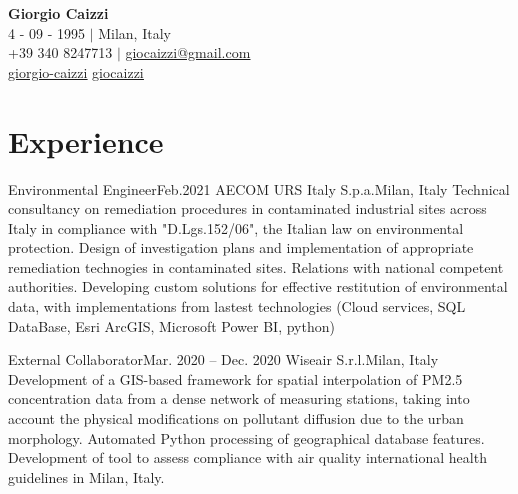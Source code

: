 




\begin{center}
  \textbf{\Huge \bfseries Giorgio Caizzi} \\
  \vspace{2pt} 4 - 09 - 1995 $|$ Milan, Italy \\
  \small +39 340 8247713 $|$ \href{mailto:x@x.com}{\underline{giocaizzi@gmail.com}}\\
  \faLinkedinSquare{ : }\href{https://linkedin.com/in/giorgio-caizzi/}{\underline{giorgio-caizzi}} \faGithubSquare{ : }\href{https://www.github.com/giocaizzi/}{\underline{giocaizzi}}\\
\end{center}

\section{Experience}
\subHeadingListStart

\subHeading
{Environmental Engineer}{Feb.2021}
{AECOM URS Italy S.p.a.}{Milan, Italy}
{Technical consultancy on remediation procedures in contaminated industrial sites across Italy
  in compliance with "D.Lgs.152/06", the Italian law on environmental protection.}
\subHeadingItemListStart
\subHeadingItem
{Design of investigation plans and implementation of appropriate
  remediation technogies in contaminated sites.}
\subHeadingItem
{Relations with national competent authorities.}
\subHeadingItem
{Developing custom solutions for effective restitution of environmental data,
  with implementations from lastest technologies (Cloud services, SQL DataBase,
  Esri ArcGIS, Microsoft Power BI, python)}
\subHeadingItemListEnd

\subHeading
{External Collaborator}{Mar. 2020 -- Dec. 2020}
{Wiseair S.r.l.}{Milan, Italy}
{Development of a GIS-based framework for spatial interpolation of PM2.5 concentration
  data from a dense network of measuring stations, taking into account the physical
  modifications on pollutant diffusion due to the urban morphology.}
\subHeadingItemListStart
\subHeadingItem
{Automated Python processing of geographical database features.}
\subHeadingItem
{Development of tool to assess compliance with air quality international health guidelines
  in Milan, Italy.}
\subHeadingItemListEnd

